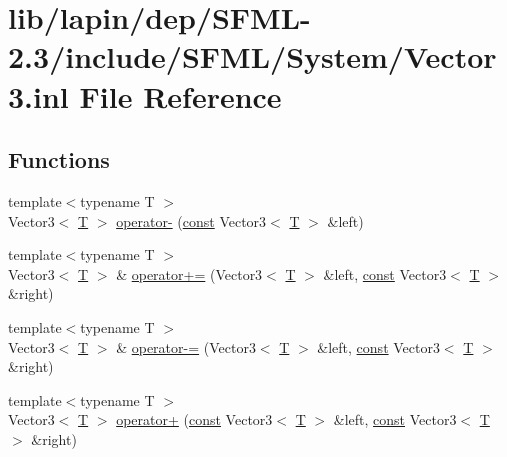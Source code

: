 \hypertarget{lapin_2dep_2_s_f_m_l-2_83_2include_2_s_f_m_l_2_system_2_vector3_8inl}{\section{lib/lapin/dep/\-S\-F\-M\-L-\/2.3/include/\-S\-F\-M\-L/\-System/\-Vector3.inl File Reference}
\label{lapin_2dep_2_s_f_m_l-2_83_2include_2_s_f_m_l_2_system_2_vector3_8inl}
}
\subsection*{Functions}
\begin{DoxyCompactItemize}
\item 
{\footnotesize template$<$typename T $>$ }\\Vector3$<$ \hyperlink{curses_8priv_8h_a5ef253115820acf7d27f3c5c3b02a0f0}{T} $>$ \hyperlink{lapin_2dep_2_s_f_m_l-2_83_2include_2_s_f_m_l_2_system_2_vector3_8inl_a14eae4e552fcf9fdc317d612be92dbfe}{operator-\/} (\hyperlink{term__entry_8h_a57bd63ce7f9a353488880e3de6692d5a}{const} Vector3$<$ \hyperlink{curses_8priv_8h_a5ef253115820acf7d27f3c5c3b02a0f0}{T} $>$ \&left)
\item 
{\footnotesize template$<$typename T $>$ }\\Vector3$<$ \hyperlink{curses_8priv_8h_a5ef253115820acf7d27f3c5c3b02a0f0}{T} $>$ \& \hyperlink{lapin_2dep_2_s_f_m_l-2_83_2include_2_s_f_m_l_2_system_2_vector3_8inl_a0d2cd514825e2d2c50271684a9356c16}{operator+=} (Vector3$<$ \hyperlink{curses_8priv_8h_a5ef253115820acf7d27f3c5c3b02a0f0}{T} $>$ \&left, \hyperlink{term__entry_8h_a57bd63ce7f9a353488880e3de6692d5a}{const} Vector3$<$ \hyperlink{curses_8priv_8h_a5ef253115820acf7d27f3c5c3b02a0f0}{T} $>$ \&right)
\item 
{\footnotesize template$<$typename T $>$ }\\Vector3$<$ \hyperlink{curses_8priv_8h_a5ef253115820acf7d27f3c5c3b02a0f0}{T} $>$ \& \hyperlink{lapin_2dep_2_s_f_m_l-2_83_2include_2_s_f_m_l_2_system_2_vector3_8inl_a9d5c48185baa729118053f6512d94a9c}{operator-\/=} (Vector3$<$ \hyperlink{curses_8priv_8h_a5ef253115820acf7d27f3c5c3b02a0f0}{T} $>$ \&left, \hyperlink{term__entry_8h_a57bd63ce7f9a353488880e3de6692d5a}{const} Vector3$<$ \hyperlink{curses_8priv_8h_a5ef253115820acf7d27f3c5c3b02a0f0}{T} $>$ \&right)
\item 
{\footnotesize template$<$typename T $>$ }\\Vector3$<$ \hyperlink{curses_8priv_8h_a5ef253115820acf7d27f3c5c3b02a0f0}{T} $>$ \hyperlink{lapin_2dep_2_s_f_m_l-2_83_2include_2_s_f_m_l_2_system_2_vector3_8inl_aa57b1433e51c98ce9389ce02916f19c2}{operator+} (\hyperlink{term__entry_8h_a57bd63ce7f9a353488880e3de6692d5a}{const} Vector3$<$ \hyperlink{curses_8priv_8h_a5ef253115820acf7d27f3c5c3b02a0f0}{T} $>$ \&left, \hyperlink{term__entry_8h_a57bd63ce7f9a353488880e3de6692d5a}{const} Vector3$<$ \hyperlink{curses_8priv_8h_a5ef253115820acf7d27f3c5c3b02a0f0}{T} $>$ \&right)

\end{DoxyCompactItemize}
